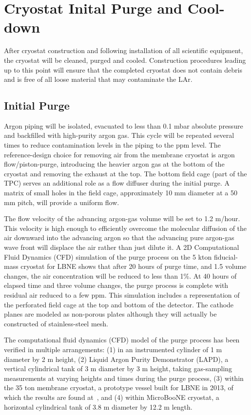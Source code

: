 \section{Cryostat Inital Purge and Cool-down}

After cryostat construction and following installation of all 
scientific equipment, the cryostat will be cleaned, purged and 
cooled. Construction procedures leading up to this point will
ensure that the completed cryostat does not contain debris and is free
of all loose material that may contaminate the LAr.

\subsection{Initial Purge} 

Argon piping will be isolated, evacuated to less than 0.1 mbar
absolute pressure and backfilled with high-purity argon gas.
This cycle will be repeated several times to reduce contamination
levels in the piping to the ppm level. The reference-design choice
for removing air from the membrane cryostat is argon
flow/piston-purge, introducing the heavier argon gas at the
bottom of the cryostat and removing the exhaust at the top. The bottom
field cage (part of the TPC) serves an additional role as a flow
diffuser during the initial purge. A matrix of small holes in the
field cage, approximately 10 mm diameter at a 50 mm pitch,
will provide a uniform flow.

The flow velocity of the advancing argon-gas volume will be set to 1.2 m/hour.
This velocity is high enough to efficiently overcome the molecular diffusion
of the air downward into the advancing argon so that the advancing pure
argon-gas wave front will displace the air rather than just dilute it.
A 2D Computational Fluid Dynamics (CFD) simulation of the purge process
on the 5 kton fiducial-mass cryostat for LBNE shows that after 20 hours
of purge time, and 1.5 volume changes, the air concentration will be
reduced to less than 1\%. At 40 hours of elapsed time and three volume
changes, the purge process is complete with residual air reduced to a
few ppm. This simulation includes a representation of the perforated
field cage at the top and bottom of the detector.  The cathode planes
are modeled as non-porous plates although they will actually be
constructed of stainless-steel mesh.

The computational fluid dynamics (CFD) model of the purge process 
has been verified in multiple arrangements: (1) in an instrumented 
cylinder of 1 m diameter by 2 m height, (2) Liquid Argon Purity 
Demonstrator (LAPD), a vertical cylindrical tank of 3 m diameter by 3 m height,
taking gas-sampling measurements at varying heights and times during 
the purge process, (3) within the 35 ton membrane cryostat, a 
prototype vessel built for LBNE in 2013, of which the results 
are found at~\cite{Montanari:2013/06/13aqa}, %
and (4) within MicroBooNE cryostat, a horizontal cylindrical
tank of 3.8 m diameter by 12.2 m length.

